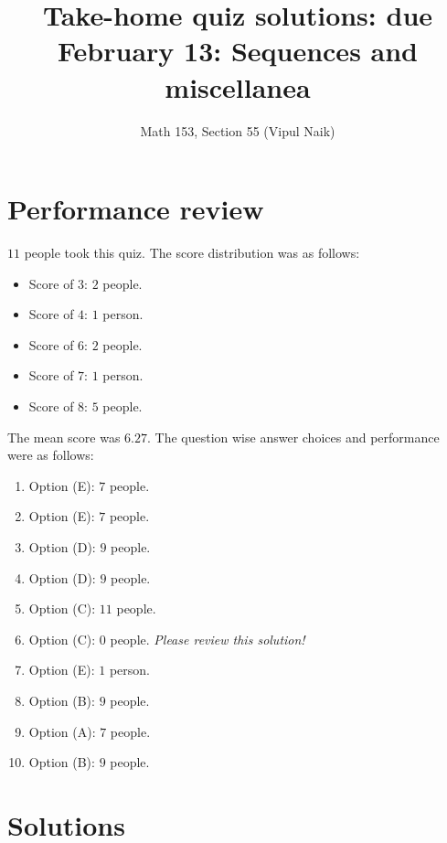 \documentclass[10pt]{amsart}
\title{Take-home quiz solutions: due February 13: Sequences and miscellanea}
\author{Math 153, Section 55 (Vipul Naik)}
\begin{document}
\maketitle

\section{Performance review}

$11$ people took this quiz. The score distribution was as follows:

\begin{itemize}
\item Score of $3$: $2$ people.
\item Score of $4$: $1$ person.
\item Score of $6$: $2$ people.
\item Score of $7$: $1$ person.
\item Score of $8$: $5$ people.
\end{itemize}

The mean score was $6.27$. The question wise answer choices and
performance were as follows:

\begin{enumerate}
\item Option (E): $7$ people.
\item Option (E): $7$ people.
\item Option (D): $9$ people.
\item Option (D): $9$ people.
\item Option (C): $11$ people.
\item Option (C): $0$ people. {\em Please review this solution!}
\item Option (E): $1$ person.
\item Option (B): $9$ people.
\item Option (A): $7$ people.
\item Option (B): $9$ people.
\end{enumerate}
\section{Solutions}
\end{document}
